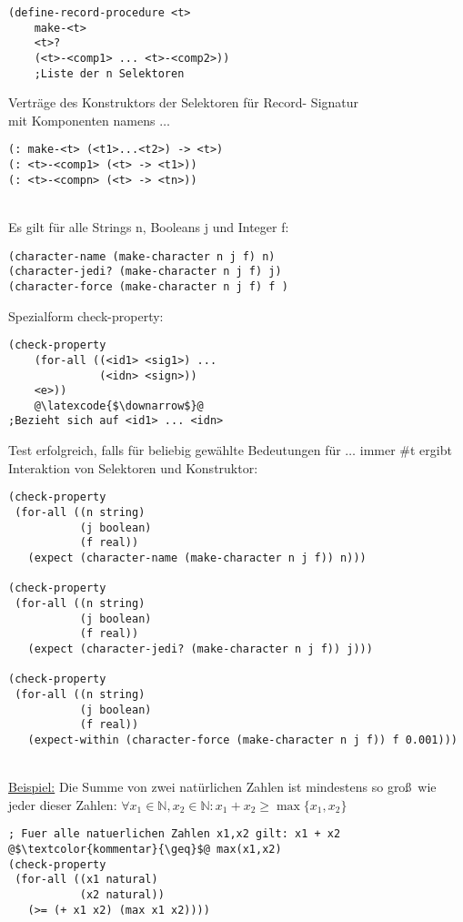 \begin{lstlisting}
(define-record-procedure <t>
	make-<t>
	<t>?
	(<t>-<comp1> ... <t>-<comp2>))
	;Liste der n Selektoren
\end{lstlisting}
Verträge des Konstruktors\/ der Selektoren für Record- Signatur\\
\argt{} mit Komponenten namens  $\ldots$ \\
\begin{lstlisting}
(: make-<t> (<t1>...<t2>) -> <t>)
(: <t>-<comp1> (<t> -> <t1>))
(: <t>-<compn> (<t> -> <tn>))
\end{lstlisting}
\linie\\
Es gilt für alle Strings n, Booleans j und Integer f:
\begin{lstlisting}
(character-name (make-character n j f) n)
(character-jedi? (make-character n j f) j)
(character-force (make-character n j f) f )
\end{lstlisting}
Spezialform check-property:\\
\begin{lstlisting}
(check-property
	(for-all ((<id1> <sig1>) ... 
			  (<idn> <sign>))
	<e>))
	@\latexcode{$\downarrow$}@
;Bezieht sich auf <id1> ... <idn>	
\end{lstlisting}
Test erfolgreich, falls \arge{} für beliebig gewählte Bedeutungen für  $\ldots$  immer \#t ergibt\\
Interaktion von Selektoren und Konstruktor:
\begin{lstlisting}[frame=listing]
(check-property 
 (for-all ((n string)
           (j boolean)
           (f real))
   (expect (character-name (make-character n j f)) n)))

(check-property 
 (for-all ((n string)
           (j boolean)
           (f real))
   (expect (character-jedi? (make-character n j f)) j)))

(check-property 
 (for-all ((n string)
           (j boolean)
           (f real))
   (expect-within (character-force (make-character n j f)) f 0.001)))
\end{lstlisting}
\linie\\
\underline{Beispiel:} Die Summe von zwei natürlichen Zahlen ist mindestens so gro\ss \ wie jeder dieser Zahlen: $ \forall x_1 \in \mathbb{N}, x_2 \in \mathbb{N} : x_1 + x_2 \geq \max\{x_1,x_2\}$
\begin{lstlisting}[frame=single]
; Fuer alle natuerlichen Zahlen x1,x2 gilt: x1 + x2 @$\textcolor{kommentar}{\geq}$@ max(x1,x2)
(check-property
 (for-all ((x1 natural)
           (x2 natural))
   (>= (+ x1 x2) (max x1 x2))))
\end{lstlisting}
